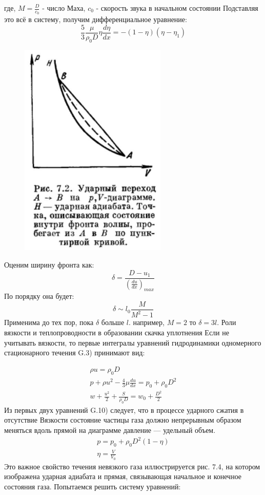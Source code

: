 \documentclass[10pt, a4paper]{article}
\begin{document}
где, $M=\frac{D}{c_0}$ - число Маха, $c_0$ - скорость звука в начальном состоянии 
Подставляя это всё в систему, получим дифференциальное уравнение:
\begin{equation}
	\frac{5}{3} \frac{\mu}{\rho_0 D} \eta \frac{d\eta}{dx}=-(1-\eta)(\eta - \eta_1)
\end{equation}

\begin{figure}[h!]
	\begin{center}
		\includegraphics[width=70mm]{13. adiab udarn.JPG}
	\end{center}
\end{figure}

Оценим ширину фронта как:
\begin{equation}
	\delta = \frac{D-u_1}{(\frac{du}{dx})_{max}}
\end{equation}
По порядку она будет:
\begin{equation}
	\delta \sim l_0 \frac{M}{M^{2}-1}
\end{equation}
Применима до тех пор, пока $\delta$ больше $l$. например, $M=2$ то $\delta=3 l$.
Роли вязкости и теплопроводности в образовании скачка уплотнения 
Если не учитывать вязкости, то первые интегралы уравнений гидродинамики одномерного стационарного течения G.3) принимают вид: 

\begin{eqnarray}
	\rho u = \rho_0 D \\ p+\rho u^{2} - \frac{4}{3} \mu \frac{du}{dx} = p_0 + \rho_0 D^{2} \\ w + \frac{u^{2}}{2} + \frac{S}{\rho_0 D}  = w_0 + \frac{D^{2}}{2}
\end{eqnarray}
Из первых двух уравнений G.10) следует, что в процессе ударного сжатия в отсутствие Вязкости состояние частицы газа должно непрерывным образом меняться вдоль прямой на диаграмме давление — удельный объем. 
\begin{eqnarray}
	p=p_0 + \rho_0 D^{2} (1-\eta) \\ \eta=\frac{V}{V_0}
\end{eqnarray}
Это важное свойство течения невязкого газа иллюстрируется рис. 7.4, на котором изображена ударная адиабата и прямая, связывающая начальное и конечное состояния газа. Попытаемся решить систему уравнений: 
\end{document}
